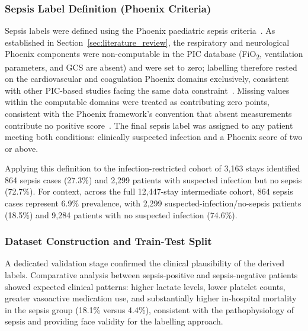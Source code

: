 \documentclass[final,3p,times]{elsarticle}
\begin{document}
\subsubsection{Sepsis Label Definition (Phoenix Criteria)}
\label{subsec:labelling}

Sepsis labels were defined using the Phoenix paediatric sepsis
criteria~\cite{sanchezpinto2024}. As established in
Section~\ref{sec:literature_review}, the respiratory and
neurological Phoenix components were non-computable in the PIC
database (FiO\textsubscript{2}, ventilation parameters, and GCS
are absent) and were set to zero; labelling therefore rested on
the cardiovascular and coagulation Phoenix domains exclusively,
consistent with other PIC-based studies facing the same data
constraint~\cite{chanci2025}. Missing values within the computable
domains were treated as contributing zero points, consistent with
the Phoenix framework's convention that absent measurements
contribute no positive score~\cite{sanchezpinto2024}. The final
sepsis label was assigned to any patient meeting both conditions:
clinically suspected infection and a Phoenix score of two or
above.

Applying this definition to the infection-restricted cohort of
3,163 stays identified 864 sepsis cases (27.3\%) and 2,299
patients with suspected infection but no sepsis (72.7\%). For
context, across the full 12,447-stay intermediate cohort, 864
sepsis cases represent 6.9\% prevalence, with 2,299
suspected-infection/no-sepsis patients (18.5\%) and 9,284 patients
with no suspected infection (74.6\%).

\subsubsection{Dataset Construction and Train-Test Split}
\label{subsec:verification}

A dedicated validation stage confirmed the clinical plausibility
of the derived labels. Comparative analysis between
sepsis-positive and sepsis-negative patients showed expected
clinical patterns: higher lactate levels, lower platelet counts,
greater vasoactive medication use, and substantially higher
in-hospital mortality in the sepsis group (18.1\% versus 4.4\%),
consistent with the pathophysiology of sepsis and providing face
validity for the labelling approach.
\end{document}
